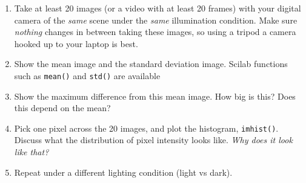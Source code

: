 \documentclass[a4paper]{article}
\begin{document}
\begin{enumerate}
\item Take at least 20 images (or a video with at least 20 frames) with your digital camera 
of the \textit{same} scene under the \textit{same}
illumination condition. Make sure \emph{nothing} changes in between taking these
images, so using a tripod a camera hooked up to your laptop is best.
\item Show the mean image and the standard deviation image. Scilab functions 
such as \texttt{mean()} and \texttt{std()} are available
\item Show the maximum difference from this mean image. How big is this? Does this depend
on the mean?
\item Pick one pixel across the 20 images, and plot the histogram,
\texttt{imhist()}. Discuss what the distribution of pixel intensity looks like.  \emph{Why does it
look like that?}
\item Repeat under a different lighting condition (light vs dark).
\end{enumerate}
\end{document}
